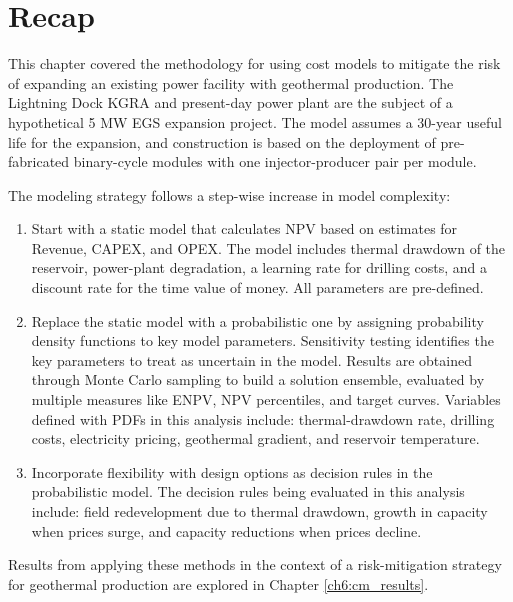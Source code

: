 \section{Recap} \label{ch4:recap}

This chapter covered the methodology for using cost models to mitigate the risk of expanding an existing power facility with geothermal production. The Lightning Dock KGRA and present-day power plant are the subject of a hypothetical 5 MW EGS expansion project. The model assumes a 30-year useful life for the expansion, and construction is based on the deployment of pre-fabricated binary-cycle modules with one injector-producer pair per module.

The modeling strategy follows a step-wise increase in model complexity:
\begin{enumerate}
    \item Start with a static model that calculates NPV based on estimates for Revenue, CAPEX, and OPEX. The model includes thermal drawdown of the reservoir, power-plant degradation, a learning rate for drilling costs, and a discount rate for the time value of money. All parameters are pre-defined.
    \item Replace the static model with a probabilistic one by assigning probability density functions to key model parameters. Sensitivity testing identifies the key parameters to treat as uncertain in the model. Results are obtained through Monte Carlo sampling to build a solution ensemble, evaluated by multiple measures like ENPV, NPV percentiles, and target curves. Variables defined with PDFs in this analysis include: thermal-drawdown rate, drilling costs, electricity pricing, geothermal gradient, and reservoir temperature.
    \item Incorporate flexibility with design options as decision rules in the probabilistic model. The decision rules being evaluated in this analysis include: field redevelopment due to thermal drawdown, growth in capacity when prices surge, and capacity reductions when prices decline.
\end{enumerate}

Results from applying these methods in the context of a risk-mitigation strategy for geothermal production are explored in Chapter \ref{ch6:cm_results}. 